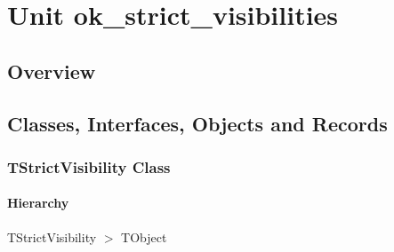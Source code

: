\documentclass{report}
\newif\ifpdf
\begin{document}
\label{toc}\tableofcontents
\newpage
\newlength{\tmplength}
\chapter{Unit ok{\_}strict{\_}visibilities}
\label{ok_strict_visibilities}
\section{Overview}
\begin{description}
\item[\texttt{\begin{ttfamily}TStrictVisibility\end{ttfamily} Class}]
\end{description}
\section{Classes, Interfaces, Objects and Records}
\ifpdf
\subsection*{\large{\textbf{TStrictVisibility Class}}\normalsize\hspace{1ex}\hrulefill}
\else
\subsection*{TStrictVisibility Class}
\fi
\label{ok_strict_visibilities.TStrictVisibility}
\subsubsection*{\large{\textbf{Hierarchy}}\normalsize\hspace{1ex}\hfill}
TStrictVisibility {$>$} TObject
\end{document}
